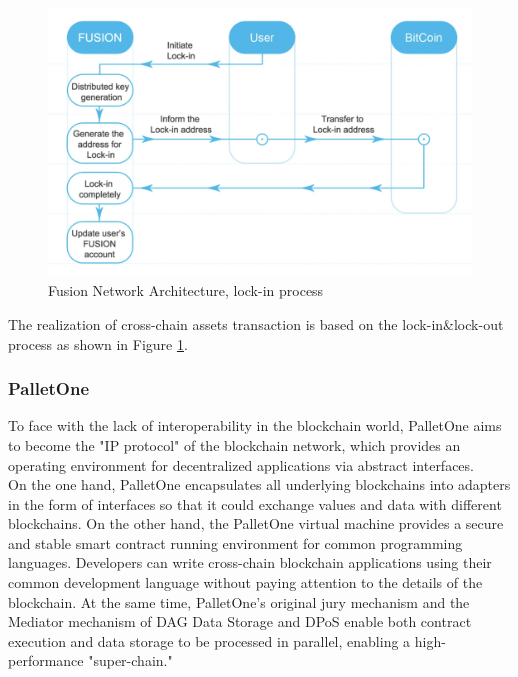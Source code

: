         \begin{figure}[H]
        \includegraphics[width=1\textwidth]{./figures/lockin}
        \centering
        \caption{{Fusion Network Architecture, lock-in process}\protect\footnotemark}
        \centering
        \label{fig:lockin}
        
        \end{figure}
\noindent The realization of cross-chain assets transaction is based on the lock-in\&lock-out process as shown in Figure \ref{fig:lockin}.


\subsubsection{PalletOne}
\noindent To face with the lack of interoperability in the blockchain world, PalletOne aims to become the "IP protocol" of the blockchain network, which provides an operating environment for decentralized applications via abstract interfaces.\cite{palletone} \\

\noindent On the one hand, PalletOne encapsulates all underlying blockchains into adapters in the form of interfaces so that it could exchange values and data with different blockchains. On the other hand, the PalletOne virtual machine provides a secure and stable smart contract running environment for common programming languages. Developers can write cross-chain blockchain applications using their common development language without paying attention to the details of the blockchain. At the same time, PalletOne's original jury mechanism and the Mediator mechanism of DAG Data Storage and DPoS enable both contract execution and data storage to be processed in parallel, enabling a high-performance "super-chain."\\

